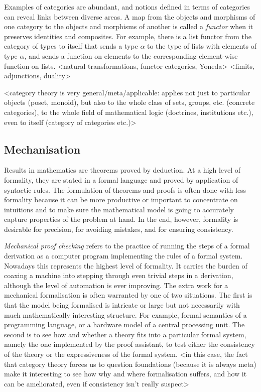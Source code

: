 \documentclass[twoside,titlepage,11pt]{article}
\begin{document}
Examples of categories are abundant, and notions defined in terms of categories can reveal links between diverse areas.
A map from the objects and morphisms of one category to the objects and morphisms of another is called a \emph{functor} when it preserves identities and composites.
For example, there is a list functor from the category of types to itself that sends a type $\alpha$ to the type of lists with elements of type $\alpha$, and sends a function on elements to the corresponding element-wise function on lists.
<natural transformations, functor categories, Yoneda>
<limits, adjunctions, duality>%

<category theory is very general/meta/applicable: applies not just to particular objects (poset, monoid), but also to the whole class of sets, groups, etc. (concrete categories), to the whole field of mathematical logic (doctrines, institutions etc.), even to itself (category of categories etc.)>%
\subsection{Mechanisation}%
Results in mathematics are theorems proved by deduction.
At a high level of formality, they are stated in a formal language and proved by application of syntactic rules.
The formulation of theorems and proofs is often done with less formality because it can be more productive or important to concentrate on intuitions and to make sure the mathematical model is going to accurately capture properties of the problem at hand.
In the end, however, formality is desirable for precision, for avoiding mistakes, and for ensuring consistency.%

\emph{Mechanical proof checking} refers to the practice of running the steps of a formal derivation as a computer program implementing the rules of a formal system.
Nowadays this represents the highest level of formality.
It carries the burden of coaxing a machine into stepping through even trivial steps in a derivation, although the level of automation is ever improving.
The extra work for a mechanical formalisation is often warranted by one of two situations.
The first is that the model being formalised is intricate or large but not necessarily with much mathematically interesting structure.
For example, formal semantics of a programming language, or a hardware model of a central processing unit.
The second is to see how and whether a theory fits into a particular formal system, namely the one implemented by the proof assistant, to test either the consistency of the theory or the expressiveness of the formal system.
<in this case, the fact that category theory forces us to question foundations (because it is always meta) make it interesting to see how why and where formalisation suffers, and how it can be ameliorated, even if consistency isn't really suspect>%
\end{document}
